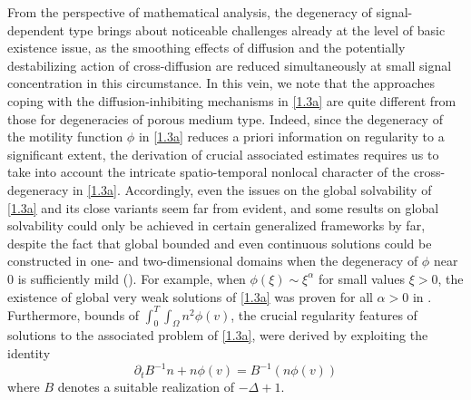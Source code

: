 \documentclass[12pt]{article}
\theoremstyle{plain}
\theoremstyle{definition}
\numberwithin{equation}{section}
\begin{document}
From the perspective of mathematical analysis, the degeneracy of signal-dependent type
brings about noticeable challenges
 already at the level of basic existence issue, as the smoothing effects of diffusion and the potentially destabilizing action of cross-diffusion are reduced simultaneously at small signal concentration in this circumstance. In this vein,
we note that the approaches coping with the diffusion-inhibiting mechanisms in \eqref{1.3a} are quite different from those for degeneracies of porous medium type. Indeed, since the degeneracy of the motility function $\phi$ in \eqref{1.3a}
 reduces a priori information on regularity to a significant extent,  the derivation of crucial associated estimates
requires us to take into account the intricate spatio-temporal nonlocal character of the cross-degeneracy in \eqref{1.3a}.
 Accordingly, even the issues on the global solvability of \eqref{1.3a} and its close variants seem far from evident, and some results on global solvability could only be achieved  in certain generalized frameworks by far, despite the fact that global bounded and even continuous solutions could be constructed in one- and two-dimensional
domains when the  degeneracy of $\phi$  near $0$ is sufficiently mild
 (\cite{WinklerM3AS,Winkleradv,WinklerZAMP,Ligenglin,Liangwang}).
For example,
when  $\phi(\xi)\sim \xi^\alpha $ for small values $\xi>0$, the existence of global very weak solutions
 of \eqref{1.3a}
  was proven for
all $\alpha>0$   in \cite{WinklerZAMP}. Furthermore, bounds
of  $ \int^T_0\int_{\Omega} n^2 \phi(v)$, the crucial regularity features of solutions to the associated
 problem of \eqref{1.3a}, were derived by exploiting the identity
\begin{equation}\label{1.4}
\partial_t B^{-1}n+ n\phi (v)= B^{-1}( n\phi (v)) \end{equation}
 where $B$ denotes a suitable realization of $-\Delta+1$.
\end{document}
